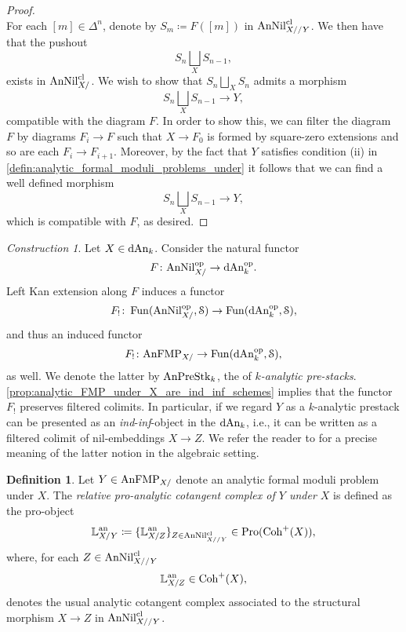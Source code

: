 \documentclass[10pt,a4paper,reqno]{amsart} %
\theoremstyle{plain}
\theoremstyle{definition}
\newtheorem{defin}[thm]{Definition}
\theoremstyle{remark}
\numberwithin{equation}{section}
\newtheorem{construction}[thm]{Construction}
\begin{document}
\begin{proof}
\[        \]
    For each $[m] \in \Delta^{n}$, denote by $S_m \coloneqq F([m]) $ in $\mathrm{AnNil}^{\mathrm{cl}}_{X//Y}$. We then have that the pushout
        \[
            S_n \bigsqcup_X S_{n-1},  
        \]
    exists in $\mathrm{AnNil}^{\mathrm{cl}}_{X/}$. We wish to show that $S_n \bigsqcup_X S_n$ admits a morphism
        \[S_n \bigsqcup_X S_{n-1} \to Y,\]
    compatible with the diagram $F$. In order to show this, we can filter the diagram $F$ by diagrams $F_i \to F$ such that $X \to F_0$ is formed by square-zero
    extensions and so are each $F_i \to F_{i+1}$. Moreover, by the fact that $Y$ satisfies condition (ii) in \cref{defin:analytic_formal_moduli_problems_under}
    it follows that we can find a well defined morphism
        \[
            S_n \bigsqcup_X S_{n-1} \to Y,  
        \]
    which is compatible with $F$, as desired.
\end{proof}


\begin{construction}\label{const:anFMP_as_ind_inf_schemes} Let $X \in \mathrm{dAn}_k$. Consider the natural functor
    \[
        F \colon \mathrm{AnNil}_{X/} ^\mathrm{op} \to \mathrm{dAn}_k ^\mathrm{op}.
    \]
Left Kan extension along $F$ induces a functor
    \[
        F_! \colon \operatorname{Fun}( \mathrm{AnNil}_{X/ }^\mathrm{op}, \mathcal S) \to \operatorname{Fun}  (\mathrm{dAn}_k^\mathrm{op}, \mathcal S),
    \]
and thus an induced functor
    \[
        F_! \colon \mathrm{AnFMP}_{X/} \to \operatorname{Fun}(\mathrm{dAn}_k^\mathrm{op}, \mathcal S),
    \]
as well. We denote the latter \infcat by $\mathrm{AnPreStk}_k$, the \infcat
of \emph{$k$-analytic pre-stacks}. \cref{prop:analytic_FMP_under_X_are_ind_inf_schemes} implies that the functor $F_!$ preserves filtered colimits.
In particular, if we regard $Y$ as a $k$-analytic prestack can be presented
as an \emph{ind}-\emph{inf}-object in the \infcat $\mathrm{dAn}_k$, i.e., it can be written as a filtered colimit of nil-embeddings $X \to Z$.
We refer the reader to \cite{Gaitsgory_Study_II} for a precise meaning
of the latter notion in the algebraic setting.
\end{construction}



\begin{defin}
    Let $Y \in \mathrm{AnFMP}_{X/}$ denote an analytic formal moduli problem under $X$. The \emph{relative pro-analytic cotangent complex of $Y$ under $X$} is defined as the pro-object
        \[
            \mathbb L^\mathrm{an}_{X/Y} \coloneqq \{ \mathbb L^\mathrm{an}_{X/Z} \}_{Z \in \mathrm{AnNil}^{\mathrm{cl}}_{X//Y}}  \in \mathrm{Pro}(\mathrm{Coh}^+(X)),
        \]
    where, for each $Z \in \mathrm{AnNil}^{\mathrm{cl}}_{X//Y}$
        \[\mathbb L^\mathrm{an}_{X/Z} \in \mathrm{Coh}^+(X),\]
    denotes the usual analytic cotangent complex associated to
    the structural morphism $X \to Z$ in $\mathrm{AnNil}^{\mathrm{cl}}_{X//Y}$.
\end{defin}
\end{document}
